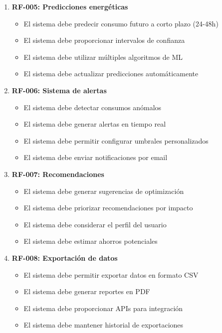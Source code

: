 \begin{enumerate}
    \item \textbf{RF-005: Predicciones energéticas}
    \begin{itemize}
        \item El sistema debe predecir consumo futuro a corto plazo (24-48h)
        \item El sistema debe proporcionar intervalos de confianza
        \item El sistema debe utilizar múltiples algoritmos de ML
        \item El sistema debe actualizar predicciones automáticamente
    \end{itemize}
    
    \item \textbf{RF-006: Sistema de alertas}
    \begin{itemize}
        \item El sistema debe detectar consumos anómalos
        \item El sistema debe generar alertas en tiempo real
        \item El sistema debe permitir configurar umbrales personalizados
        \item El sistema debe enviar notificaciones por email
    \end{itemize}
    
    \item \textbf{RF-007: Recomendaciones}
    \begin{itemize}
        \item El sistema debe generar sugerencias de optimización
        \item El sistema debe priorizar recomendaciones por impacto
        \item El sistema debe considerar el perfil del usuario
        \item El sistema debe estimar ahorros potenciales
    \end{itemize}
    
    \item \textbf{RF-008: Exportación de datos}
    \begin{itemize}
        \item El sistema debe permitir exportar datos en formato CSV
        \item El sistema debe generar reportes en PDF
        \item El sistema debe proporcionar APIs para integración
        \item El sistema debe mantener historial de exportaciones
    \end{itemize}
\end{enumerate}

